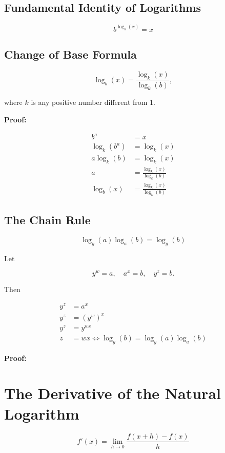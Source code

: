 \subsection{Fundamental Identity of Logarithms}

\[
    b^{\log_b(x)} = x
\]

\subsection{Change of Base Formula}

\[
    \log_b(x) = \frac{\log_k(x)}{\log_k(b)},
\]

where \(k\) is any positive number different from 1.

\textbf{Proof:}

\begin{align*}
    b^a &= x \\ 
    \log_k (b^a) &= \log_k (x) \\ 
    a \log_k (b) &= \log_k (x) \\ 
    a &= \frac{\log_k(x)}{\log_k(b)} \\ 
    \log_b (x) &= \frac{\log_k(x)}{\log_k(b)} 
\end{align*}

\QED

\subsection{The Chain Rule}

\[
    \log_y(a) \log_a(b) = \log_y(b)
\]

Let

\[
    y^w = a, \quad a^x = b, \quad y^z = b.
\]

Then

\begin{align*}
    y^z &= a^x \\ 
    y^z &= (y^w)^x \\
    y^z &= y^{wx} \\
    z &= wx  \iff \log_y(b) = \log_y(a) \log_a(b) 
\end{align*}

\QED 

\textbf{Proof:}

\section{The Derivative of the Natural Logarithm}

\[
    f'(x) = \lim_{h \to 0} \frac{f(x + h) - f(x)}{h}
\]


